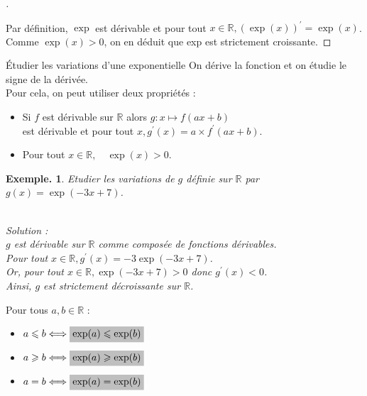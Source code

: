 \documentclass[12pt]{article}
\theoremstyle{break}
\newtheorem*{example}{Exemple.}
\newenvironment{demo}[1][\proofname]{%
  \begin{proof}[#1]$ $\newline
  }{%
  \end{proof}
}
\begin{document}
\begin{demo}
  Par définition, $\exp$ est dérivable et pour tout $x \in \mathbb{R},(\exp (x))^{\prime}=\exp (x)$. Comme $\exp (x)>0$, on en déduit que exp est strictement croissante.
\end{demo}

\begin{method}{Étudier les variations d'une exponentielle}{}
  On dérive la fonction et on étudie le signe de la dérivée.\\
  Pour cela, on peut utiliser deux propriétés :

  \begin{itemize}
    \item Si $f$ est dérivable sur $\mathbb{R}$ alors $g: x \longmapsto f(a x+b)$\\
      est dérivable et pour tout $x, g^{\prime}(x)=a \times f^{\prime}(a x+b)$.
    \item Pour tout $x \in \mathbb{R}, \quad \exp (x)>0$.
  \end{itemize}
\end{method}

\begin{example}
  Etudier les variations de $g$ définie sur $\mathbb{R}$ par $g(x)=\exp (-3 x+7)$.

  ~\\Solution :\\
  $g$ est dérivable sur $\mathbb{R}$ comme composée de fonctions dérivables.\\
  Pour tout $x \in \mathbb{R}, g^{\prime}(x)=-3 \exp (-3 x+7)$.\\
  Or, pour tout $x \in \mathbb{R}, \exp (-3 x+7)>0$ donc $g^{\prime}(x)<0$.\\
  Ainsi, $g$ est strictement décroissante sur $\mathbb{R}$.
\end{example}

\begin{proposition}{}{}
  Pour tous $a, b \in \mathbb{R}$ :

  \begin{itemize}
    \item $a \leqslant b \Longleftrightarrow \hideM{\exp (a) \leqslant \exp (b)}$
    \item $a \geqslant b \Longleftrightarrow \hideM{\exp (a) \geqslant \exp (b)}$
    \item $a=b \Longleftrightarrow \hideM{\exp (a)=\exp (b)}$
  \end{itemize}
\end{proposition}
\end{document}
